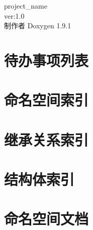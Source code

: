 \let\mypdfximage\pdfximage\def\pdfximage{\immediate\mypdfximage}\documentclass[twoside]{book}
\newcommand{\+}{\discretionary{\mbox{\scriptsize$\hookleftarrow$}}{}{}}
\newcommand{\clearemptydoublepage}{%
  \newpage{\pagestyle{empty}\cleardoublepage}%
}
\begin{document}
\raggedbottom
\begin{CJK}{UTF8}{min}

\hypersetup{pageanchor=false,
             bookmarksnumbered=true,
             pdfencoding=unicode
            }
\begin{titlepage}
\vspace*{7cm}
\begin{center}%
{\Large project\+\_\+name \\[1ex]\large ver\+:1.\+0 }\\
\vspace*{1cm}
{\large 制作者 Doxygen 1.9.1}\\
\end{center}
\end{titlepage}
\clearemptydoublepage
{}
\tableofcontents
\clearemptydoublepage
{}
\hypersetup{pageanchor=true}

\chapter{待办事项列表}
\label{todo}

\chapter{命名空间索引}

\chapter{继承关系索引}

\chapter{结构体索引}

\chapter{命名空间文档}


\end{CJK}
\end{document}
